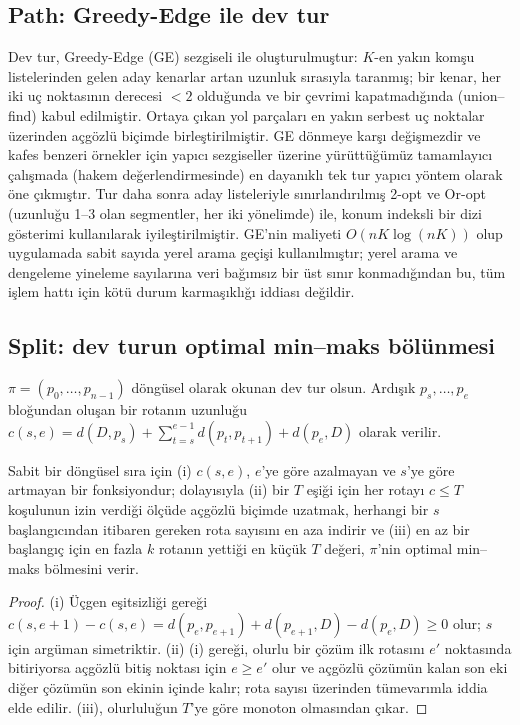 \subsection{Path: Greedy-Edge ile dev tur}
Dev tur, Greedy-Edge (GE) sezgiseli \citep{bentley1992} ile oluşturulmuştur:
$K$-en yakın komşu listelerinden gelen aday kenarlar artan uzunluk sırasıyla taranmış;
bir kenar, her iki uç noktasının derecesi $<2$ olduğunda ve bir çevrimi kapatmadığında
(union--find) kabul edilmiştir. Ortaya çıkan yol parçaları en yakın serbest uç noktalar
üzerinden açgözlü biçimde birleştirilmiştir. GE dönmeye karşı değişmezdir ve kafes benzeri
örnekler için yapıcı sezgiseller üzerine yürüttüğümüz tamamlayıcı çalışmada (hakem değerlendirmesinde) en
dayanıklı tek tur yapıcı yöntem olarak öne çıkmıştır. Tur daha sonra aday listeleriyle sınırlandırılmış 2-opt \citep{croes1958} ve Or-opt \citep{or1976}
(uzunluğu 1--3 olan segmentler, her iki yönelimde) ile, konum indeksli bir dizi gösterimi
kullanılarak iyileştirilmiştir. GE'nin maliyeti $O(nK\log(nK))$ olup uygulamada
sabit sayıda yerel arama geçişi kullanılmıştır; yerel arama ve dengeleme yineleme
sayılarına veri bağımsız bir üst sınır konmadığından bu, tüm işlem hattı için
kötü durum karmaşıklığı iddiası değildir.

\subsection{Split: dev turun optimal min--maks bölünmesi}
$\pi=(p_0,\dots,p_{n-1})$ döngüsel olarak okunan dev tur olsun. Ardışık $p_s,\dots,p_e$
bloğundan oluşan bir rotanın uzunluğu
$c(s,e)=d(D,p_s)+\sum_{t=s}^{e-1}d(p_t,p_{t+1})+d(p_e,D)$ olarak verilir.

\begin{lemma}\label{lem:split}
Sabit bir döngüsel sıra için (i) $c(s,e)$, $e$'ye göre azalmayan ve $s$'ye göre artmayan
bir fonksiyondur; dolayısıyla (ii) bir $T$ eşiği için her rotayı $c\le T$ koşulunun izin verdiği
ölçüde açgözlü biçimde uzatmak, herhangi bir $s$ başlangıcından itibaren gereken rota sayısını en aza indirir ve
(iii) en az bir başlangıç için en fazla $k$ rotanın yettiği en küçük $T$ değeri, $\pi$'nin
optimal min--maks bölmesini verir.
\end{lemma}
\begin{proof}
(i) Üçgen eşitsizliği gereği $c(s,e+1)-c(s,e)=d(p_e,p_{e+1})+d(p_{e+1},D)-d(p_e,D)\ge 0$
olur; $s$ için argüman simetriktir. (ii) (i) gereği, olurlu bir
çözüm ilk rotasını $e'$ noktasında bitiriyorsa açgözlü bitiş noktası için $e\ge e'$ olur ve açgözlü çözümün kalan
son eki diğer çözümün son ekinin içinde kalır; rota sayısı üzerinden tümevarımla
iddia elde edilir. (iii), olurluluğun $T$'ye göre monoton olmasından
çıkar.
\end{proof}

